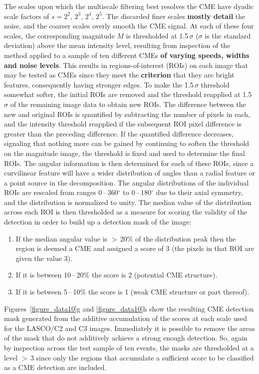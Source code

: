 \documentclass[preprint2]{aastex}
\begin{document}
The scales upon which the multiscale filtering best resolves the CME have dyadic scale factors of $s=2^{2},\,2^{3},\,2^{4},\,2^{5}$. The discarded finer scales {\bf mostly detail} the noise, and the coarser scales overly smooth the CME signal. At each of these four scales, the corresponding magnitude $M$ is thresholded at 1.5\,$\sigma$ ($\sigma$ is the standard deviation) above the mean intensity level, resulting from inspection of the method applied to a sample of ten different CMEs {\bf of varying speeds, widths and noise levels}. This results in regions-of-interest (ROIs) on each image that may be tested as CMEs since they meet the {\bf criterion} that they are bright features, consequently having stronger edges. To make the 1.5\,$\sigma$ threshold somewhat softer, the initial ROIs are removed and the threshold reapplied at 1.5\,$\sigma$ of the remaining image data to obtain new ROIs. The difference between the new and original ROIs is quantified by subtracting the number of pixels in each, and the intensity threshold reapplied if the subsequent ROI pixel difference is greater than the preceding difference. If the quantified difference decreases, signaling that nothing more can be gained by continuing to soften the threshold on the magnitude image, the threshold is fixed and used to determine the final ROIs. The angular information is then determined for each of these ROIs, since a curvilinear feature will have a wider distribution of angles than a radial feature or a point source in the decomposition. The angular distributions of the individual ROIs are rescaled from ranges 0\,--\,360$^{\circ}$ to 0\,--\,180$^{\circ}$ due to their axial symmetry, and the distribution is normalized to unity. The median value of the distribution across each ROI is then thresholded as a measure for scoring the validity of the detection in order to build up a detection mask of the image:
\begin{enumerate}
\item If the median angular value is $>$\,20\% of the distribution peak then the region is deemed a CME and assigned a score of 3 (the pixels in that ROI are given the value 3).
\item If it is between 10\,--\,20\% the score is 2 (potential CME structure).
\item If it is between 5\,--\,10\% the score is 1 (weak CME structure or part thereof).
\end{enumerate}
Figures~\ref{figure_data10}g and \ref{figure_data10}h show the resulting CME detection mask generated from the additive accumulation of the scores at each scale used for the LASCO/C2 and C3 images. Immediately it is possible to remove the areas of the mask that do not additively achieve a strong enough detection. So, again by inspection across the test sample of ten events, the masks are thresholded at a level $>$\,3 since only the regions that accumulate a sufficient score to be classified as a CME detection are included.
\end{document}
